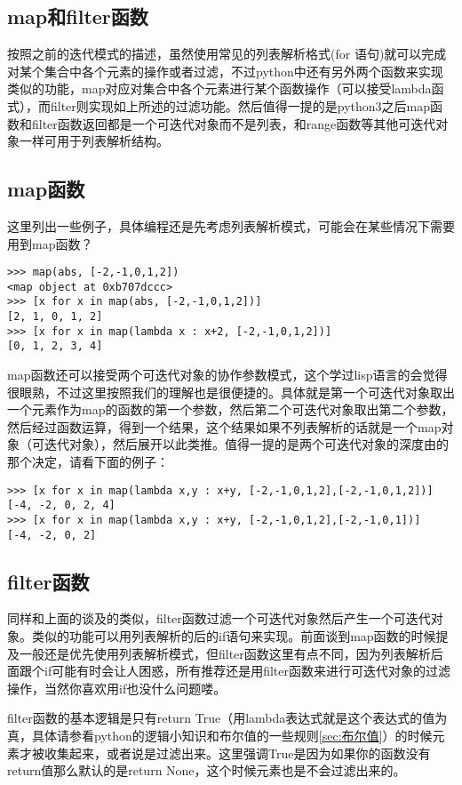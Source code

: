 \documentclass[12pt,oneside]{book}
\begin{document}
\begin{common-format}
\section{map和filter函数}
按照之前的迭代模式的描述，虽然使用常见的列表解析格式(for 语句)就可以完成对某个集合中各个元素的操作或者过滤，不过python中还有另外两个函数来实现类似的功能，map对应对集合中各个元素进行某个函数操作（可以接受lambda函式），而filter则实现如上所述的过滤功能。然后值得一提的是python3之后map函数和filter函数返回都是一个可迭代对象而不是列表，和range函数等其他可迭代对象一样可用于列表解析结构。

\subsection{map函数}
这里列出一些例子，具体编程还是先考虑列表解析模式，可能会在某些情况下需要用到map函数？

\begin{Verbatim}
>>> map(abs, [-2,-1,0,1,2])
<map object at 0xb707dccc>
>>> [x for x in map(abs, [-2,-1,0,1,2])]
[2, 1, 0, 1, 2]
>>> [x for x in map(lambda x : x+2, [-2,-1,0,1,2])]
[0, 1, 2, 3, 4]
\end{Verbatim}


map函数还可以接受两个可迭代对象的协作参数模式，这个学过lisp语言的会觉得很眼熟，不过这里按照我们的理解也是很便捷的。具体就是第一个可迭代对象取出一个元素作为map的函数的第一个参数，然后第二个可迭代对象取出第二个参数，然后经过函数运算，得到一个结果，这个结果如果不列表解析的话就是一个map对象（可迭代对象），然后展开以此类推。值得一提的是两个可迭代对象的深度由的那个决定，请看下面的例子：
\begin{Verbatim}
>>> [x for x in map(lambda x,y : x+y, [-2,-1,0,1,2],[-2,-1,0,1,2])]
[-4, -2, 0, 2, 4]
>>> [x for x in map(lambda x,y : x+y, [-2,-1,0,1,2],[-2,-1,0,1])]
[-4, -2, 0, 2]
\end{Verbatim}

\subsection{filter函数}
同样和上面的谈及的类似，filter函数过滤一个可迭代对象然后产生一个可迭代对象。类似的功能可以用列表解析的后的if语句来实现。前面谈到map函数的时候提及一般还是优先使用列表解析模式，但filter函数这里有点不同，因为列表解析后面跟个if可能有时会让人困惑，所有推荐还是用filter函数来进行可迭代对象的过滤操作，当然你喜欢用if也没什么问题喽。

filter函数的基本逻辑是只有return True（用lambda表达式就是这个表达式的值为真，具体请参看python的逻辑小知识和布尔值的一些规则\ref{sec:布尔值}）的时候元素才被收集起来，或者说是过滤出来。这里强调True是因为如果你的函数没有return值那么默认的是return None，这个时候元素也是不会过滤出来的。


\end{common-format}
\end{document}
